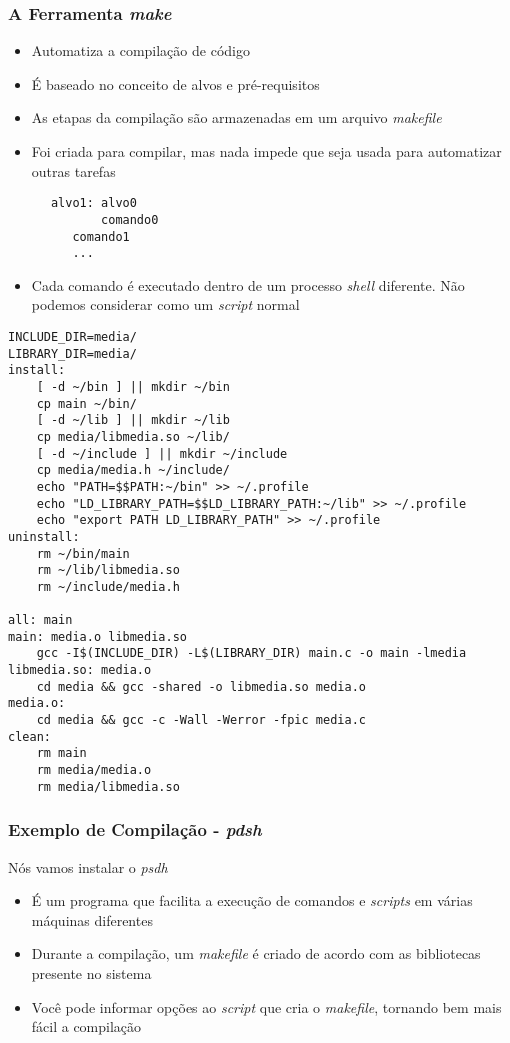 \documentclass{beamer}
\begin{document}
   \begin{frame}[fragile]
      \frametitle{A Ferramenta \textit{make}}
      \begin{itemize}
         \item Automatiza a compilação de código
	 \item É baseado no conceito de alvos e pré-requisitos
	 \item As etapas da compilação são armazenadas em um arquivo \textit{makefile}
	 \item Foi criada para compilar, mas nada impede que seja usada para automatizar outras tarefas
      \end{itemize}
      \begin{verbatim}
      alvo1: alvo0
             comando0
	     comando1
	     ...
      \end{verbatim}
      \begin{itemize}
         \item Cada comando é executado dentro de um processo \textit{shell} diferente. Não podemos considerar como um \textit{script} normal
      \end{itemize}
\end{frame}


   \begin{frame}[fragile]
   \scriptsize
   \begin{verbatim}
INCLUDE_DIR=media/
LIBRARY_DIR=media/
install:	
	[ -d ~/bin ] || mkdir ~/bin
	cp main ~/bin/
	[ -d ~/lib ] || mkdir ~/lib
	cp media/libmedia.so ~/lib/
	[ -d ~/include ] || mkdir ~/include
	cp media/media.h ~/include/
	echo "PATH=$$PATH:~/bin" >> ~/.profile
	echo "LD_LIBRARY_PATH=$$LD_LIBRARY_PATH:~/lib" >> ~/.profile
	echo "export PATH LD_LIBRARY_PATH" >> ~/.profile
uninstall:
	rm ~/bin/main
	rm ~/lib/libmedia.so
	rm ~/include/media.h

all: main
main: media.o libmedia.so
	gcc -I$(INCLUDE_DIR) -L$(LIBRARY_DIR) main.c -o main -lmedia
libmedia.so: media.o
	cd media && gcc -shared -o libmedia.so media.o
media.o:
	cd media && gcc -c -Wall -Werror -fpic media.c
clean:
	rm main
	rm media/media.o
	rm media/libmedia.so
   \end{verbatim}
\end{frame}

   \begin{frame}
      \frametitle{Exemplo de Compilação - \textit{pdsh}}
      Nós vamos instalar o \textit{psdh}
      \begin{itemize}
         \item É um programa que facilita a execução de comandos e \textit{scripts} em várias máquinas diferentes
	 \item Durante a compilação, um \textit{makefile} é criado de acordo com as bibliotecas presente no sistema
	 \item Você pode informar opções ao \textit{script} que cria o \textit{makefile}, tornando bem mais fácil a compilação
      \end{itemize}
   \end{frame}
   
\end{document}
